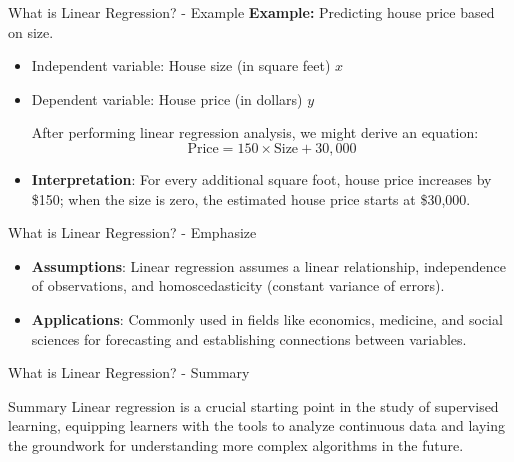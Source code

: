 \documentclass[aspectratio=169]{beamer}
\begin{document}
\begin{frame}[fragile]{What is Linear Regression? - Example}
    \textbf{Example:} Predicting house price based on size.
    
    \begin{itemize}
        \item Independent variable: House size (in square feet) \(x\)
        \item Dependent variable: House price (in dollars) \(y\)
        
        After performing linear regression analysis, we might derive an equation:
        \begin{equation}
        \text{Price} = 150 \times \text{Size} + 30,000
        \end{equation}
        
        \item \textbf{Interpretation}: For every additional square foot, house price increases by \$150; when the size is zero, the estimated house price starts at \$30,000.
    \end{itemize}
\end{frame}

\begin{frame}[fragile]{What is Linear Regression? - Emphasize}
    \begin{itemize}
        \item \textbf{Assumptions}: Linear regression assumes a linear relationship, independence of observations, and homoscedasticity (constant variance of errors).
        \item \textbf{Applications}: Commonly used in fields like economics, medicine, and social sciences for forecasting and establishing connections between variables.
    \end{itemize}
\end{frame}

\begin{frame}[fragile]{What is Linear Regression? - Summary}
    \begin{block}{Summary}
        Linear regression is a crucial starting point in the study of supervised learning, equipping learners with the tools to analyze continuous data and laying the groundwork for understanding more complex algorithms in the future. 
    \end{block}
\end{frame}
\end{document}
